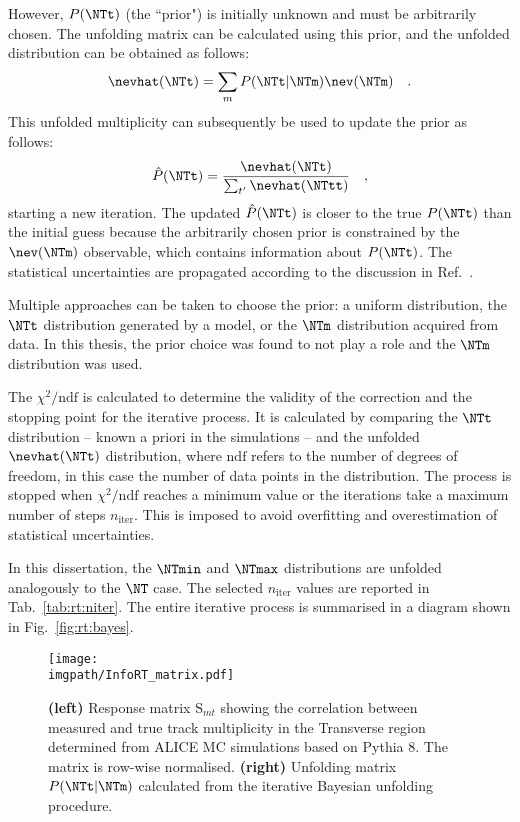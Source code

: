 However, $P(\NTt)$ (the ``prior") is initially unknown and must be arbitrarily chosen. The unfolding matrix can be calculated using this prior, and the unfolded distribution can be obtained as follows:
\begin{align}
\nevhat(\NTt) = \sum_m P(\NTt | \NTm) \nev(\NTm) \quad .
\end{align}
This unfolded multiplicity can subsequently be used to update the prior as follows:
\begin{align}
\hat{P}(\NTt) = \dfrac{\nevhat(\NTt)}{\sum_{t'} \nevhat(\NTtt)} \quad ,
\end{align}
starting a new iteration. The updated $\hat{P}(\NTt)$ is closer to the true $P(\NTt)$ than the initial guess because the arbitrarily chosen prior is constrained by the $\nev(\NTm)$ observable, which contains information about $P(\NTt)$. The statistical uncertainties are propagated according to the discussion in Ref.~\cite{dagostiniMultidimensionalUnfoldingMethod1995}.

Multiple approaches can be taken to choose the prior: a uniform distribution, the $\NTt$ distribution generated by a model, or the $\NTm$ distribution acquired from data. In this thesis, the prior choice was found to not play a role and the $\NTm$ distribution was used.

The $\chi^2/\mathrm{ndf}$ is calculated to determine the validity of the correction and the stopping point for the iterative process. It is calculated by comparing the $\NTt$ distribution -- known a priori in the simulations -- and the unfolded $\nevhat(\NTt)$ distribution, where $\mathrm{ndf}$ refers to the number of degrees of freedom, in this case the number of data points in the distribution. The process is stopped when $\chi^2/\mathrm{ndf}$ reaches a minimum value or the iterations take a maximum number of steps $n_\mathrm{iter}$. This is imposed to avoid overfitting and overestimation of statistical uncertainties. 

In this dissertation, the $\NTmin$ and $\NTmax$ distributions are unfolded analogously to the $\NT$ case. The selected $n_\mathrm{iter}$ values are reported in Tab.~\ref{tab:rt:niter}. The entire iterative process is summarised in a diagram shown in Fig.~\ref{fig:rt:bayes}. 

\begin{figure}%
\texttt{[image: \\imgpath/InfoRT\_matrix.pdf]}\\
\caption{\textbf{(left)} Response matrix $\mathrm{S}_{mt}$ showing the correlation between measured and true track multiplicity in the Transverse region determined from ALICE MC simulations based on Pythia 8. The matrix is row-wise normalised. \textbf{(right)} Unfolding matrix $P(\NTt | \NTm)$ calculated from the iterative Bayesian unfolding procedure.}
\label{fig:rt:matrix}
\end{figure}

